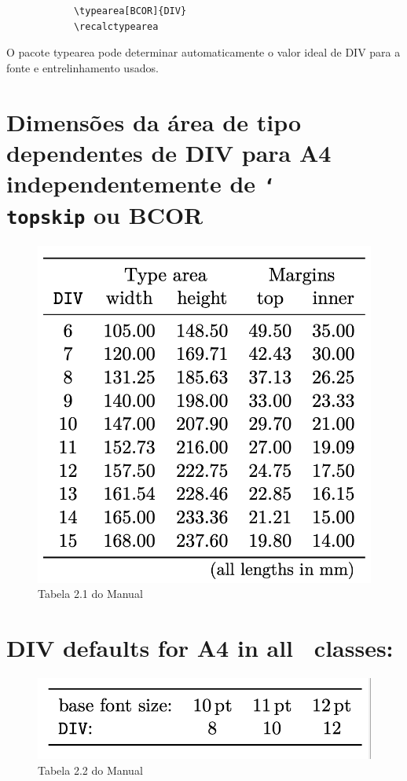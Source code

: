 \begin{verbatim}
            \typearea[BCOR]{DIV}
            \recalctypearea
\end{verbatim}


O pacote typearea pode determinar automaticamente o valor ideal de DIV para a fonte e entrelinhamento usados.

\section{Dimensões da área de tipo dependentes de DIV para A4 independentemente de \texttt{\char`\\topskip} ou BCOR}


\begin{figure}[h]
    \centering
    \includegraphics[width=0.55\linewidth]{tab2_1.png}
    \caption{Tabela 2.1 do Manual}
    \label{fig:tab2_1l}
\end{figure}

\section{DIV defaults for A4 in all \KOMAScript\ classes:}
\begin{figure}[h]
    \centering
    \includegraphics[width=0.6\linewidth]{tab2_2.png}
    \caption{Tabela 2.2 do Manual}
    \label{fig:tab2_2}
\end{figure}

